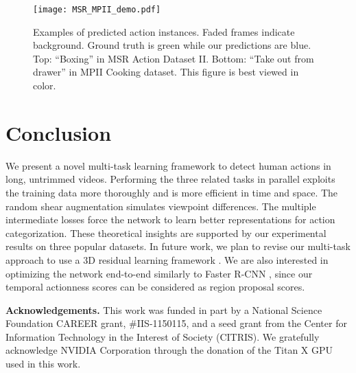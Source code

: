 \documentclass[10pt,twocolumn,letterpaper]{article}
\begin{document}
\begin{figure}[t]
	\centering
	\texttt{[image: MSR\_MPII\_demo.pdf]}
	\vspace{-18ex}
	\caption{Examples of predicted action instances. Faded frames indicate background. Ground truth is green while our predictions are blue. Top: ``Boxing'' in MSR Action Dataset II. Bottom: ``Take out from drawer'' in MPII Cooking dataset. This figure is best viewed in color. }
	\label{fig:MSRandMPII}
\end{figure}

\section{Conclusion}
\label{sec:conclusion}
We present a novel multi-task learning framework to detect human actions in long, untrimmed videos. 
Performing the three related tasks in parallel exploits the training data more thoroughly and is more efficient in time and space. The random shear augmentation simulates viewpoint differences. The multiple intermediate losses force the network to learn better representations for action categorization. These theoretical insights are supported by our experimental results on three popular datasets.
In future work, we plan to revise our multi-task approach to use a 3D residual learning framework \cite{residual_cvpr16}. 
We are also interested in optimizing the network end-to-end similarly to Faster R-CNN \cite{fasterRCNN}, since our temporal actionness scores can be considered as region proposal scores. 
\newline

\noindent \textbf{Acknowledgements.} This work was funded in part by a National Science Foundation CAREER grant, $\#$IIS-1150115, and a seed grant from the Center for Information Technology in the Interest of Society (CITRIS). We gratefully acknowledge NVIDIA Corporation through the donation of the Titan X GPU used in this work.

{\small
	
	
}
\end{document}
